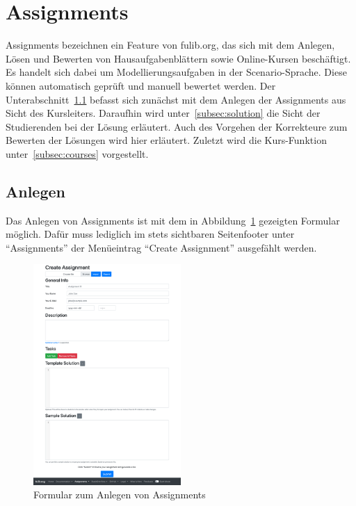 \section{Assignments}\label{sec:assignments}

Assignments bezeichnen ein Feature von fulib.org, das sich mit dem Anlegen, Lösen und Bewerten von Hausaufgabenblättern sowie Online-Kursen beschäftigt.
Es handelt sich dabei um Modellierungsaufgaben in der Scenario-Sprache.
Diese können automatisch geprüft und manuell bewertet werden.
Der Unterabschnitt~\ref{subsec:creation} befasst sich zunächst mit dem Anlegen der Assignments aus Sicht des Kursleiters.
Daraufhin wird unter~\ref{subsec:solution} die Sicht der Studierenden bei der Lösung erläutert.
Auch des Vorgehen der Korrekteure zum Bewerten der Lösungen wird hier erläutert.
Zuletzt wird die Kurs-Funktion unter~\ref{subsec:courses} vorgestellt.

\subsection{Anlegen}\label{subsec:creation}

Das Anlegen von Assignments ist mit dem in Abbildung~\ref{fig:create-assignment} gezeigten Formular möglich.
Dafür muss lediglich im stets sichtbaren Seitenfooter unter ``Assignments'' der Menüeintrag ``Create Assignment'' ausgefählt werden.

\begin{figure}
    \centering
    \includegraphics[width=0.5\textwidth]{chapter/fulib.org/img/create-assignment.png}
    \caption{Formular zum Anlegen von Assignments}
    \label{fig:create-assignment}
\end{figure}

